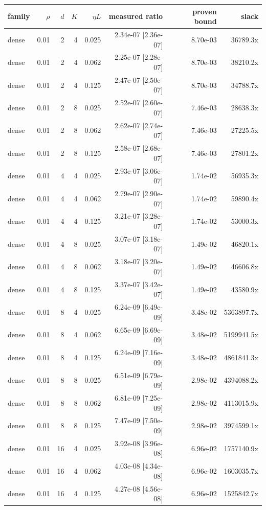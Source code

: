\begin{tabular}{lrrrrrrr}
\toprule
family & $\rho$ & $d$ & $K$ & $\eta L$ & measured ratio & proven bound & slack \\
\midrule
dense & 0.01 & 2 & 4 & 0.025 & 2.34e-07 [2.36e-07] & 8.70e-03 & 36789.3x \\
dense & 0.01 & 2 & 4 & 0.062 & 2.25e-07 [2.28e-07] & 8.70e-03 & 38210.2x \\
dense & 0.01 & 2 & 4 & 0.125 & 2.47e-07 [2.50e-07] & 8.70e-03 & 34788.7x \\
dense & 0.01 & 2 & 8 & 0.025 & 2.52e-07 [2.60e-07] & 7.46e-03 & 28638.3x \\
dense & 0.01 & 2 & 8 & 0.062 & 2.62e-07 [2.74e-07] & 7.46e-03 & 27225.5x \\
dense & 0.01 & 2 & 8 & 0.125 & 2.58e-07 [2.68e-07] & 7.46e-03 & 27801.2x \\
dense & 0.01 & 4 & 4 & 0.025 & 2.93e-07 [3.06e-07] & 1.74e-02 & 56935.3x \\
dense & 0.01 & 4 & 4 & 0.062 & 2.79e-07 [2.90e-07] & 1.74e-02 & 59890.4x \\
dense & 0.01 & 4 & 4 & 0.125 & 3.21e-07 [3.28e-07] & 1.74e-02 & 53000.3x \\
dense & 0.01 & 4 & 8 & 0.025 & 3.07e-07 [3.18e-07] & 1.49e-02 & 46820.1x \\
dense & 0.01 & 4 & 8 & 0.062 & 3.18e-07 [3.20e-07] & 1.49e-02 & 46606.8x \\
dense & 0.01 & 4 & 8 & 0.125 & 3.37e-07 [3.42e-07] & 1.49e-02 & 43580.9x \\
dense & 0.01 & 8 & 4 & 0.025 & 6.24e-09 [6.49e-09] & 3.48e-02 & 5363897.7x \\
dense & 0.01 & 8 & 4 & 0.062 & 6.65e-09 [6.69e-09] & 3.48e-02 & 5199941.5x \\
dense & 0.01 & 8 & 4 & 0.125 & 6.24e-09 [7.16e-09] & 3.48e-02 & 4861841.3x \\
dense & 0.01 & 8 & 8 & 0.025 & 6.51e-09 [6.79e-09] & 2.98e-02 & 4394088.2x \\
dense & 0.01 & 8 & 8 & 0.062 & 6.81e-09 [7.25e-09] & 2.98e-02 & 4113015.9x \\
dense & 0.01 & 8 & 8 & 0.125 & 7.47e-09 [7.50e-09] & 2.98e-02 & 3974599.1x \\
dense & 0.01 & 16 & 4 & 0.025 & 3.92e-08 [3.96e-08] & 6.96e-02 & 1757140.9x \\
dense & 0.01 & 16 & 4 & 0.062 & 4.03e-08 [4.34e-08] & 6.96e-02 & 1603035.7x \\
dense & 0.01 & 16 & 4 & 0.125 & 4.27e-08 [4.56e-08] & 6.96e-02 & 1525842.7x \\

\end{tabular}
